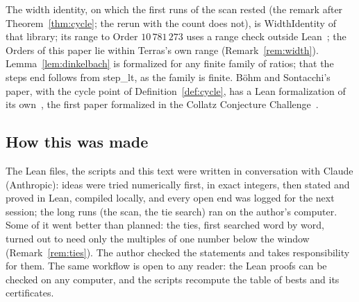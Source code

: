 \documentclass[10pt,a4paper,titlepage]{article}
\newcommand{\lean}[1]{\textsf{#1}}
\theoremstyle{plain}
\theoremstyle{definition}
\theoremstyle{remark}
\begin{document}
The width identity, on which the first runs of the scan rested (the remark after Theorem~\ref{thm:cycle}; the rerun with the count does not), is
\lean{WidthIdentity} of that library; its range to Order $10\,781\,273$ uses a range check outside
Lean~\cite{Paper2}; the Orders of this paper lie within Terras's own range (Remark~\ref{rem:width}).
Lemma~\ref{lem:dinkelbach} is formalized for any finite family of ratios; that the steps end follows
from \lean{step\_lt}, as the family is finite. Böhm and Sontacchi's paper, with the cycle point of
Definition~\ref{def:cycle}, has a Lean formalization of its own~\cite{BohmSontacchiLean}, the first paper
formalized in the Collatz Conjecture Challenge~\cite{CCChallenge}.

\subsection*{How this was made}

The Lean files, the scripts and this text were written in conversation with Claude (Anthropic):
ideas were tried numerically first, in exact integers, then stated and proved in Lean, compiled
locally, and every open end was logged for the next session; the long runs (the scan, the tie
search) ran on the author's computer. Some of it went better than planned: the ties, first
searched word by word, turned out to need only the multiples of one number below the window
(Remark~\ref{rem:ties}). The author checked the statements and takes responsibility for them.
The same workflow is open to any reader: the Lean proofs can be checked on any computer, and the
scripts recompute the table of bests and its certificates.

\appendix
\end{document}
